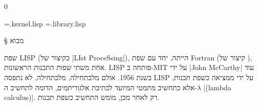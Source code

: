 \def\CPL{\E|C|\xspace}

\setcounter{library}0

\newread \tempFile %
\newwrite {} %
\newwrite \libraryFile %
\immediate \openout {}=\jobname.kernel.lisp
\immediate \openout \libraryFile=\jobname.library.lisp

\newenvironment{KERNEL}{%
  \stepcounter{kernel}
  \def\fileName{\jobname.kernel.\arabic{kernel}.lisp}%
  \global\let\savedifeof=\ifeof
  \def\ifeof##1{\global\let\ifeof=\savedifeof\iftrue}%
  \csname filecontents*\endcsname{\fileName}%
}{%
  \csname endfilecontents*\endcsname%
  \pagebreak[3]%
  \LTR
  \endLTR
  \pagebreak[3]%
  \openin\tempFile=\fileName
  \begingroup\endlinechar=-1
  \loop\unless\ifeof \tempFile
  \read\tempFile to\fileline %
  \immediate\write\kernelFile {\unexpanded\expandafter{\fileline}}
  \repeat
  \immediate\write \kernelFile {¢}
  \immediate\write \kernelFile {\unexpanded\expandafter{\pagebreak}[3]}
  \immediate\write \kernelFile {¢}
  \endgroup
  \closein \tempFile
}

\newenvironment{LIBRARY}{%
  \stepcounter{library}
  \def\fileName{\jobname.library.\arabic{library}.lisp}%
  \global\let\savedifeof=\ifeof
  \def\ifeof##1{\global\let\ifeof=\savedifeof\iftrue}%
  \csname filecontents*\endcsname{\fileName}%
}{%
  \csname endfilecontents*\endcsname%
  \pagebreak[3]%
  \LTR
  \endLTR
  \pagebreak[3]%
  \newread \tempFile %
  \openin \tempFile=\fileName
  \begingroup\endlinechar=-1
  \loop\unless\ifeof \tempFile
  \read\tempFile to\fileline %
  \immediate\write \libraryFile
  {\unexpanded\expandafter{\fileline}} %
  \repeat
  \endgroup
  \closein \tempFile
}%

§ מבוא

שפת LISP (כקיצור של \E|LIst ProceSsing|), הייתה, יחד עם שפת Fortran (קיצור של
), אחת משתי שפות התכנות הראשונות. LISP פותחה ב-MIT על
ידי \E|John McCarthy| עוד בשנת 1956. אולם מלכתחילה, מלכתחילה, לא נתפסה LISP
על ידי ממציאה כשפת תכנות, אלא כתחשיב מתמטי המיועד לכתיבת אלגוריתמים,
הדומה לתחשיב ה-$λ$ \E|(lambda calculus)|. רק לאחר מכן, מומש התחשיב כשפת תכנות.

